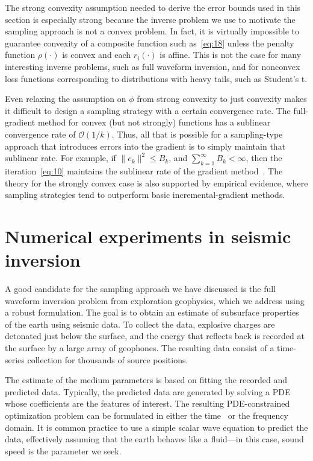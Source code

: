 \documentclass[nospthms]{svjour3}
\numberwithin{equation}{section}
\def\norm#1{\|#1\|}
\def\k{_k}
\def\Oscr{\mathcal{O}}
\begin{document}
The strong convexity assumption needed to derive the error bounds
used in this section is especially strong because the inverse
problem we use to motivate the sampling approach is not a convex
problem. In fact, it is virtually impossible to guarantee convexity of
a composite function such as~\eqref{eq:18} unless the penalty
function $\rho(\cdot)$ is convex and each $r_i(\cdot)$ is
affine. This is not the case for many interesting inverse problems,
such as full waveform inversion, and for nonconvex loss functions
corresponding to distributions with heavy tails, such as Student's t.

Even relaxing the assumption on $\phi$ from strong convexity to just
convexity makes it difficult to design a sampling strategy with a
certain convergence rate. The full-gradient method for convex (but not
strongly) functions has a sublinear convergence rate of
$\Oscr(1/k)$. Thus, all that is possible for a sampling-type approach
that introduces errors into the gradient is to simply maintain that
sublinear rate. For example, if $\norm{e\k}^2 \le B\k$, and
$\sum_{k=1}^\infty B\k<\infty$, then the iteration~\eqref{eq:10}
maintains the sublinear rate of the gradient
method~\cite[Theorem~2.6]{FS:2011}.  The theory for the strongly
convex case is also supported by empirical evidence, where sampling
strategies tend to outperform basic incremental-gradient methods.








\section{Numerical experiments in seismic inversion}
\label{sec:full-wavef-invers}

A good candidate for the sampling approach we have discussed is the
full waveform inversion problem from exploration geophysics, which we
address using a robust formulation.  The goal is to obtain an estimate
of subsurface properties of the earth using seismic data.  To collect
the data,  explosive charges are detonated just below the surface, and
the energy that reflects back is recorded at the surface by a large
array of geophones.  The resulting data consist of a time-series
collection for thousands of source positions.

The estimate of the medium parameters is based on fitting the recorded
and predicted data.  Typically, the predicted data are generated by
solving a PDE whose coefficients are the features of interest. The
resulting PDE-constrained optimization problem can be formulated in either
the time~\cite{Tarantola1984} or the frequency~\cite{Pratt95} domain.  It
is common practice to use a simple scalar wave equation to predict the
data, effectively assuming that the earth behaves like a fluid---in
this case, sound speed is the parameter we seek.
\end{document}
